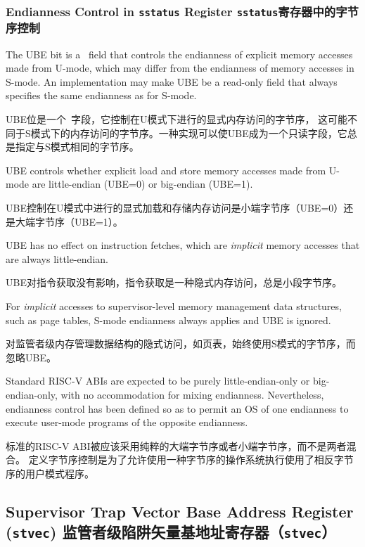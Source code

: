 \subsubsection{Endianness Control in {\tt sstatus} Register {\tt sstatus}寄存器中的字节序控制}

The UBE bit is a \warl\ field that controls the endianness of explicit
memory accesses made from U-mode, which may differ from the endianness of
memory accesses in S-mode.
An implementation may make UBE be a read-only field that always specifies
the same endianness as for S-mode.

UBE位是一个\warl\ 字段，它控制在U模式下进行的显式内存访问的字节序，
这可能不同于S模式下的内存访问的字节序。一种实现可以使UBE成为一个只读字段，它总是指定与S模式相同的字节序。

UBE controls whether explicit
load and store memory accesses made from U-mode are little-endian (UBE=0)
or big-endian (UBE=1).

UBE控制在U模式中进行的显式加载和存储内存访问是小端字节序（UBE=0）还是大端字节序（UBE=1）。

UBE has no effect on instruction fetches, which are {\em implicit} memory
accesses that are always little-endian.

UBE对指令获取没有影响，指令获取是一种隐式内存访问，总是小段字节序。

For {\em implicit} accesses to supervisor-level memory management data
structures, such as page tables, S-mode endianness always applies and UBE
is ignored.

对监管者级内存管理数据结构的隐式访问，如页表，始终使用S模式的字节序，而忽略UBE。

\begin{commentary}

  Standard RISC-V ABIs are expected to be purely little-endian-only or
  big-endian-only, with no accommodation for mixing endianness.
  Nevertheless, endianness control has been defined so as to permit an
  OS of one endianness to execute user-mode programs of the opposite
  endianness.

标准的RISC-V ABI被应该采用纯粹的大端字节序或者小端字节序，而不是两者混合。
定义字节序控制是为了允许使用一种字节序的操作系统执行使用了相反字节序的用户模式程序。

\end{commentary}

\subsection{Supervisor Trap Vector Base Address Register ({\tt stvec}) 监管者级陷阱矢量基地址寄存器（{\tt stvec}）}

